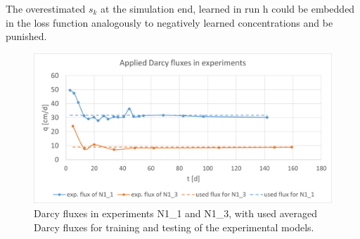 The overestimated $s_k$ at the simulation end, learned in run h could be embedded in the loss function analogously to negatively learned concentrations and be punished.
\begin{figure}
	\centering
	\includegraphics[scale=0.7]{images/comp_velo.png}
\caption[Different experimental Darcy fluxes]{Darcy fluxes in experiments N1\_1 and N1\_3, with used averaged Darcy fluxes for training and testing of the experimental models.}
\label{fig:different_velocities}
\end{figure}
